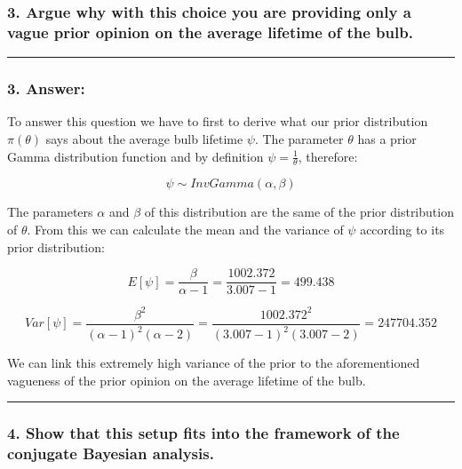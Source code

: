 \documentclass[
]{article}
\begin{document}
\hypertarget{argue-why-with-this-choice-you-are-providing-only-a-vague-prior-opinion-on-the-average-lifetime-of-the-bulb.}{%
\subsubsection{3. Argue why with this choice you are providing only a
vague prior opinion on the average lifetime of the
bulb.}\label{argue-why-with-this-choice-you-are-providing-only-a-vague-prior-opinion-on-the-average-lifetime-of-the-bulb.}}

\begin{center}\rule{0.5\linewidth}{0.5pt}\end{center}

\hypertarget{answer-6}{%
\subsubsection{3. Answer:}\label{answer-6}}

To answer this question we have to first to derive what our prior
distribution \(\pi(\theta)\) says about the average bulb lifetime
\(\psi\). The parameter \(\theta\) has a prior Gamma distribution
function and by definition \(\psi = \frac{1}{\theta}\), therefore:

\[
\psi \sim InvGamma(\alpha, \beta)
\]

The parameters \(\alpha\) and \(\beta\) of this distribution are the
same of the prior distribution of \(\theta\). From this we can calculate
the mean and the variance of \(\psi\) according to its prior
distribution:

\[
E[\psi] = \frac{\beta}{\alpha - 1} = \frac{1002.372}{3.007 - 1} = 499.438
\]

\[
Var[\psi] = \frac{\beta^2}{(\alpha - 1)^2(\alpha - 2)} =
\frac{1002.372^2}{(3.007 - 1)^2(3.007 - 2)} = 247704.352
\]

We can link this extremely high variance of the prior to the
aforementioned vagueness of the prior opinion on the average lifetime of
the bulb.

\begin{center}\rule{0.5\linewidth}{0.5pt}\end{center}

\hypertarget{show-that-this-setup-fits-into-the-framework-of-the-conjugate-bayesian-analysis.}{%
\subsubsection{4. Show that this setup fits into the framework of the
conjugate Bayesian
analysis.}\label{show-that-this-setup-fits-into-the-framework-of-the-conjugate-bayesian-analysis.}}
\end{document}
